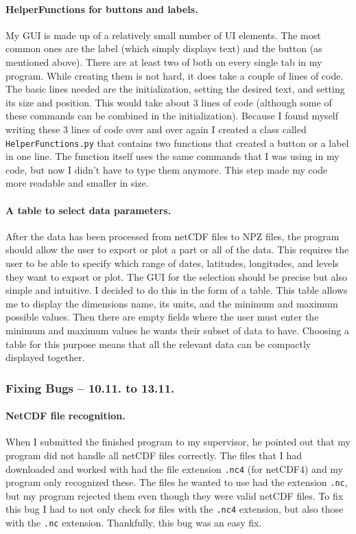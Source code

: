 \documentclass[../00_main.tex]{subfiles}
\begin{document}
\paragraph{HelperFunctions for buttons and labels.} My GUI is made up of a 
relatively
small number of UI elements. The most common ones are the label (which simply
displays text) and the button (as mentioned above). There are at least two of
both on every single tab in my program. While creating them is not hard, it
does take a couple of lines of code. The basic lines needed are the
initialization, setting the desired text, and setting its size and position.
This would take about 3 lines of code (although some of these commands can be
combined in the initialization). Because I found myself writing these 3 lines
of code over and over again I created a class called
\texttt{HelperFunctions.py} that contains two functions that created a button
or a label in one line. The function itself uses the same commands that
I was using in my code, but now I didn't have to type them anymore. This step
made my code more readable and smaller in size.

\paragraph{A table to select data parameters.} After the data has been
processed from netCDF files to NPZ files, the program should allow the user to
export or plot a part or all of the data. This requires the user to be able to
specify which range of dates, latitudes, longitudes, and levels they want to
export or plot. The GUI for the selection should be precise but also simple and
intuitive. I decided to do this in the form of a table. This table allows me to
display the dimensions name, its units, and the minimum and maximum possible
values. Then there are empty fields where the user must enter the minimum and
maximum values he wants their subset of data to have. Choosing a table for this
purpose means that all the relevant data can be compactly displayed together. 

\subsubsection{Fixing Bugs -- 10.11. to 13.11.}

\paragraph{NetCDF file recognition.} When I submitted the finished program to
my supervisor, he pointed out that my program did not handle all netCDF files
correctly. The files that I had downloaded and worked with had the file
extension \texttt{.nc4} (for netCDF4) and my program only recognized these. The
files he wanted to use had the extension \texttt{.nc}, but my program rejected
them even though they were valid netCDF files. To fix this bug I had to not
only check for files with the \texttt{.nc4} extension, but also those with
the \texttt{.nc} extension. Thankfully, this bug was an easy fix.
\end{document}
